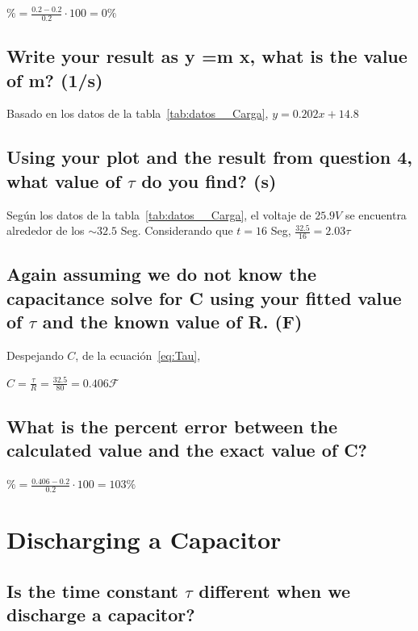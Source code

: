\documentclass[twocolumn, 12pt]{article}
\begin{document}
$\% = \frac{0.2 - 0.2}{0.2} \cdot 100 = 0\%$

\subsection{Write your result as y =m x, what is the value of m? (1/s)}

Basado en los datos de la tabla~\ref{tab:datos__Carga}, $y
    = 0.202x + 14.8$

\subsection{Using your plot and the result from question 4, what value of $\tau$ do you find? (s)}

Según los datos de la tabla~\ref{tab:datos__Carga}, el
voltaje de $25.9V$ se encuentra alrededor de los $\sim
    32.5$ Seg. Considerando que $t = 16$ Seg, $\frac{32.5}{16}
    = 2.03 \tau$

\subsection{Again assuming we do not know the capacitance solve for C using your fitted value of $\tau$
    and the known value of R. (F)}

Despejando $C$, de la ecuación~\eqref{eq:Tau},

$C = \frac{\tau}{R} = \frac{32.5}{80} = 0.406 \mathcal{F}$

\subsection{What is the percent error between the calculated value and the exact value of C?}

$\% = \frac{0.406 - 0.2}{0.2} \cdot 100 = 103\%$

\section{Discharging a Capacitor}

\subsection{Is the time constant $\tau$ different when we discharge a capacitor?}
\end{document}
